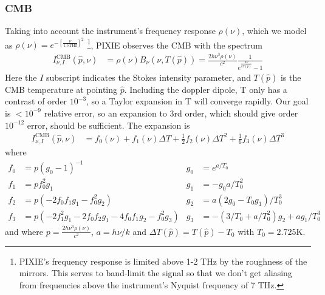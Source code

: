 \documentclass{article}
\begin{document}
\subsubsection{CMB}
\label{sect:cmb}
Taking into account the instrument's frequency response $\rho(\nu)$, which
we model as $\rho(\nu) = e^{-\left[\frac{\nu}{1.5\textrm{THz}}\right]^2}$
\footnote{PIXIE's frequency response is limited above 1-2 THz by the
roughness of the mirrors. This serves to band-limit the signal
so that we don't get aliasing from frequencies above the instrument's
Nyquist frequency of 7 THz.}, PIXIE
observes the CMB with the spectrum
\begin{align}
I^\textrm{CMB}_{\nu,I}(\hat p, \nu) &= \rho(\nu)B_\nu(\nu, T(\hat p)) = \frac{2h\nu^3\rho(\nu)}{c^2}\frac{1}{e^{\frac{h\nu}{kT(\hat p)}} - 1}
\end{align}
Here the $I$ subscript indicates the Stokes intensity parameter, and $T(\hat p)$ is the
CMB temperature at pointing $\hat p$.
Including the doppler dipole, T only has a contrast of order $10^{-3}$, so a Taylor
expansion in T will converge rapidly. Our goal is $<10^{-9}$ relative error, so an
expansion to 3rd order, which should give order $10^{-12}$ error, should be sufficient.
The expansion is
\begin{align}
	I^\textrm{CMB}_{\nu,I}(\hat p, \nu) &= f_0(\nu) + f_1(\nu) \Delta T + \frac12 f_2(\nu) \Delta T^2 + \frac16 f_3(\nu) \Delta T^3
\end{align}
where
\begin{align*}
	f_0 &= p(g_0-1)^{-1}    & g_0 &= e^{a/T_0} \\
	f_1 &= pf_0^2 g_1       & g_1 &= -g_0 a/T_0^2 \\
	f_2 &= p(-2 f_0 f_1 g_1 - f_0^2 g_2) &
	g_2 &= a(2 g_0-T_0 g_1)/T_0^3 \\
	f_3 &= p(-2 f_1^2 g_1 - 2f_0 f_2 g_1 - 4 f_0 f_1 g_2 - f_0^2 g_3) &
	g_3 &= -(3/T_0 + a/T_0^2)g_2 + a g_1/T_0^3
\end{align*}
and where $p = \frac{2h\nu^3\rho(\nu)}{c^2}$, $a = h\nu/k$ and $\Delta T(\hat p) = T(\hat p)-T_0$ with $T_0 = 2.725$K. 
\end{document}
